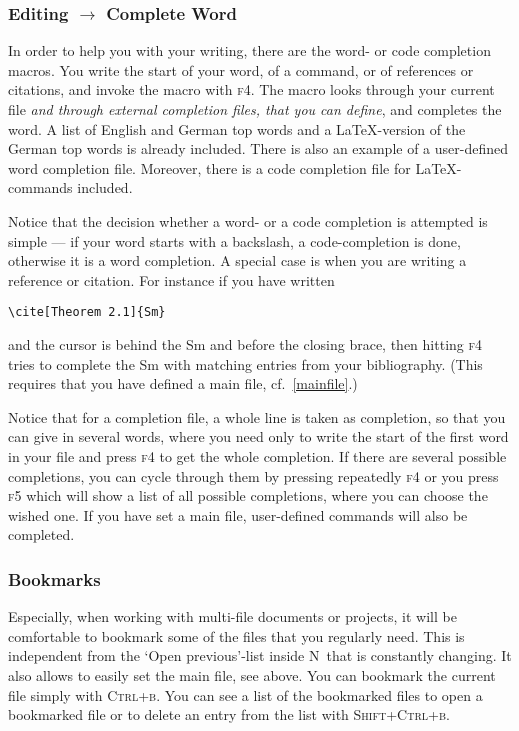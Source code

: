 \documentclass{article}
\newcommand{\nedit}{N\kern-0.8pt{Edit}}
\newcommand{\keyname}[1]{\textsc{#1}}
\begin{document}
\subsubsection{Editing $\to$ Complete Word} 
In order to help you with your writing, there are the word- or code completion macros. You write the start of your word, of a command, or of  references or citations, and invoke the macro with \keyname{f4}. The macro looks through your current file \emph{and through external completion files, that you can define}, and completes the word. A list of English and German top words and a \LaTeX-version of the German top words is already included. There is also an example of a user-defined word completion file. Moreover, there is a code completion file for \LaTeX-commands included.

Notice that the decision whether a word- or a code completion is attempted is simple --- if your word starts with a backslash, a code-completion is done, otherwise it is a word completion. A special case is when you are writing a reference or citation. For instance if you have written%
\begin{verbatim}
\cite[Theorem 2.1]{Sm}
\end{verbatim}
\noindent and the cursor is behind the Sm and before the closing brace, then hitting \keyname{f4} tries to complete the Sm with matching entries from your bibliography. (This requires that you have defined a main file, cf.~\ref{mainfile}.) 

Notice that for a completion file, a whole line is taken as completion, so that you can give in several words, where you need only to write the start of the first word in your file and press \keyname{f4} to get the whole completion. If there are several possible completions, you can cycle through them by pressing repeatedly \keyname{f4} or you press \keyname{f5} which will show a list of all possible completions, where you can choose the wished one. If you have set a main file, user-defined commands will also be completed.

\subsubsection{Bookmarks}\label{bookmarks} 
Especially, when working with multi-file documents or projects, it will be comfortable to bookmark some of the files that you regularly need. This is independent from the `Open previous'-list inside \nedit\ that is constantly changing. It also allows to easily set the main file, see above. You can bookmark the current file simply with \keyname{Ctrl+b}. You can see a list of the bookmarked files to open a bookmarked file or to delete an entry from the list with \keyname{Shift+Ctrl+b}. 
\end{document}
